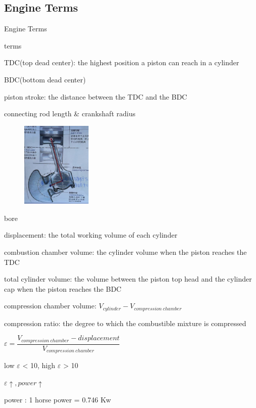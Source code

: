 \subsection{Engine Terms}
\begin{frame}{Engine Terms}
	\begin{block}{terms}
		\begin{compactitem}
			\item TDC(top dead center): the highest position a piston can reach in a cylinder
			\item BDC(bottom dead center)
			\item piston stroke: the distance between the TDC and the BDC
			\item connecting rod length \& crankshaft radius
				\begin{figure}[htbp]
					\centering
					\includegraphics[width=0.3\textwidth]{2-12}
				\end{figure}
		\end{compactitem}
	\end{block}
\end{frame}
\begin{frame}
	\begin{block}{}
		\begin{compactitem}
			\item bore
			\item displacement: the total working volume of each cylinder
			\item combustion chamber volume: the cylinder volume when the piston reaches the TDC
			\item total cylinder volume: the volume between the piston top head and the cylinder cap when the piston reaches the BDC
			\item compression chamber volume: $ V_{cylinder} - V_{compression\ chamber} $
			\item compression ratio: the degree to which the combustible mixture is compressed
				\begin{compactenum}
					\item $ \varepsilon = \dfrac{V_{compression\ chamber} - displacement}{V_{compression\ chamber}}$
					\item low $\varepsilon$ < 10, high $\varepsilon$ > 10
					\item $ \varepsilon \uparrow, power \uparrow $
				\end{compactenum}
			\item power : 1 horse power = 0.746 Kw
		\end{compactitem}
	\end{block}
\end{frame}
